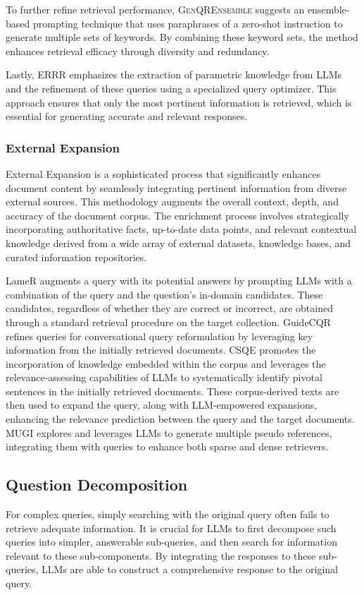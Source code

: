 \documentclass[11pt]{article}
\begin{document}
To further refine retrieval performance, \textsc{GenQREnsemble} \cite{GenQREnsemble} suggests an ensemble-based prompting technique that uses paraphrases of a zero-shot instruction to generate multiple sets of keywords. By combining these keyword sets, the method enhances retrieval efficacy through diversity and redundancy.

Lastly, \textsc{ERRR} \cite{ERRR} emphasizes the extraction of parametric knowledge from LLMs and the refinement of these queries using a specialized query optimizer. This approach ensures that only the most pertinent information is retrieved, which is essential for generating accurate and relevant responses.

\subsubsection{External Expansion}\label{External}
External Expansion is a sophisticated process that significantly enhances document content by seamlessly integrating pertinent information from diverse external sources. This methodology augments the overall context, depth, and accuracy of the document corpus. The enrichment process involves strategically incorporating authoritative facts, up-to-date data points, and relevant contextual knowledge derived from a wide array of external datasets, knowledge bases, and curated information repositories.

LameR \cite{LameR} augments a query with its potential answers by prompting LLMs with a combination of the query and the question's in-domain candidates. These candidates, regardless of whether they are correct or incorrect, are obtained through a standard retrieval procedure on the target collection.
GuideCQR \cite{GuideCQR} refines queries for conversational query reformulation by leveraging key information from the initially retrieved documents.
CSQE \cite{CSQE} promotes the incorporation of knowledge embedded within the corpus and leverages the relevance-assessing capabilities of LLMs to systematically identify pivotal sentences in the initially retrieved documents. These corpus-derived texts are then used to expand the query, along with LLM-empowered expansions, enhancing the relevance prediction between the query and the target documents.
MUGI \cite{MUGI} explores and leverages LLMs to generate multiple pseudo references, integrating them with queries to enhance both sparse and dense retrievers.

\subsection{Question Decomposition}\label{Decomposition}
For complex queries, simply searching with the original query often fails to retrieve adequate information. It is crucial for LLMs to first decompose such queries into simpler, answerable sub-queries, and then search for information relevant to these sub-components. By integrating the responses to these sub-queries, LLMs are able to construct a comprehensive response to the original query.
\end{document}
